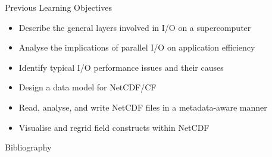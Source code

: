 \documentclass[compress,11pt,xcolor=svgnames,aspectratio=169]{beamer}
\begin{document}
\begin{frame}[fragile] {Previous Learning Objectives}

\begin{itemize}

    \item Describe the general layers involved in I/O on a supercomputer
    \item Analyse the implications of parallel I/O on application efficiency
    \item Identify typical I/O performance issues and their causes
    \item Design a data model for NetCDF/CF
    \item Read, analyse, and write NetCDF files in a metadata-aware manner
    \item Visualise and regrid field constructs within NetCDF

\end{itemize}

\end{frame}

\begin{frame}[allowframebreaks]{Bibliography}

{

\tiny




}

\end{frame}

\acknowledgement
\end{document}
